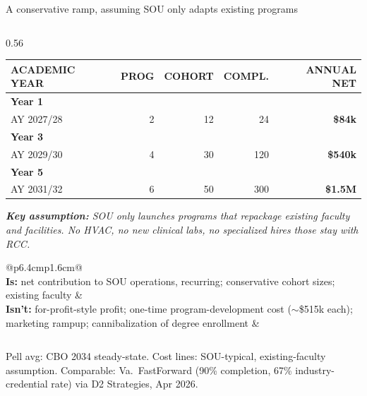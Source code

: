 \documentclass[aspectratio=169,11pt]{beamer}
\newcommand{\eyebrow}[1]{%
  {\sffamily\fontsize{7.5pt}{9pt}\selectfont
   \color{textMuted}%
   \MakeUppercase{#1}%
  }%
}
\newcommand{\monoLabel}[1]{%
  {\ttfamily\fontsize{7.5pt}{9pt}\selectfont\color{textMuted}#1}%
}
\begin{document}
\begin{frame}{A conservative ramp, assuming SOU only adapts existing programs}
\begin{columns}[T,onlytextwidth]
\begin{column}{0.56\textwidth}
      \vspace{4pt}\par
      \renewcommand{\arraystretch}{1.16}
      \begin{tabular}{@{}p{2.4cm}rrrr@{}}
        \toprule
        \eyebrow{academic year}
          & \eyebrow{prog}
          & \eyebrow{cohort}
          & \eyebrow{compl.}
          & \eyebrow{annual net}\\
        \midrule
        \textbf{Year 1}\\AY 2027/28 & 2 & 12 &  24 & \textbf{\$84k}\\
        \addlinespace[2pt]
        \textbf{Year 3}\\AY 2029/30 & 4 & 30 & 120 & \textbf{\$540k}\\
        \addlinespace[2pt]
        \textbf{Year 5}\\AY 2031/32 & 6 & 50 & 300 & \textbf{\$1.5M}\\
        \bottomrule
      \end{tabular}
      \vspace{6pt}\par
      {\itshape\color{textSecondary}\fontsize{9pt}{12pt}\selectfont
       \textbf{Key assumption:} SOU only launches programs that
       repackage existing faculty and facilities. No HVAC, no
       new clinical labs, no specialized hires \textemdash{}
       those stay with RCC.}\par
      \vspace{4pt}
      \begin{tabular}{@{}p{6.4cm}p{1.6cm}@{}}
        \multicolumn{2}{@{}l@{}}{\eyebrow{what this is \& isn't}}\\
        \addlinespace[2pt]
        \textbf{Is:} net contribution to SOU operations, recurring; conservative cohort sizes; existing faculty &\\
        \textbf{Isn't:} for-profit-style profit; one-time program-development cost ($\sim$\$5\textendash 15k each); marketing rampup; cannibalization of degree enrollment &\\
      \end{tabular}
    \end{column}
  \end{columns}
  \vspace{4pt}\par
  \monoLabel{Pell avg: CBO 2034 steady-state. Cost lines: SOU-typical, existing-faculty assumption. Comparable: Va.\ FastForward (90\% completion, 67\% industry-credential rate) via D2 Strategies, Apr 2026.}
\end{frame}
\end{document}
